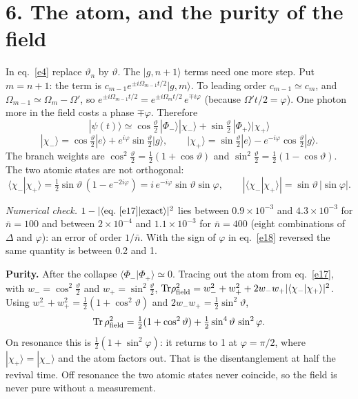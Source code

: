 \documentclass[11pt,letterpaper]{article}
\newcommand{\nbar}{\bar{n}}
\newcommand{\ket}[1]{|#1\rangle}
\newcommand{\braket}[2]{\langle#1|#2\rangle}
\newcommand{\numcheck}[1]{\par{\small\textit{Numerical check.} #1}\par}
\begin{document}
\section*{6. The atom, and the purity of the field}
In eq.~\eqref{e4} replace $\vartheta_n$ by $\vartheta$. The $\ket{g,n+1}$ terms need one more step. Put
$m=n+1$: the term is $c_{m-1}e^{\pm i\Omega_{m-1}t/2}\ket{g,m}$. To leading order $c_{m-1}\simeq c_m$,
and $\Omega_{m-1}\simeq\Omega_m-\Omega'$, so
$e^{\pm i\Omega_{m-1}t/2}=e^{\pm i\Omega_mt/2}\,e^{\mp i\varphi}$ (because $\Omega't/2=\varphi$). One
photon more in the field costs a phase $\mp\varphi$. Therefore
\begin{equation}\label{e17}
\boxed{\;\ket{\psi(t)}\simeq\cos\tfrac\vartheta2\,\ket{\Phi_-}\ket{\chi_-}+\sin\tfrac\vartheta2\,\ket{\Phi_+}\ket{\chi_+}\;}
\end{equation}
\begin{equation}\label{e18}
\ket{\chi_-}=\cos\tfrac\vartheta2\ket{e}+e^{i\varphi}\sin\tfrac\vartheta2\ket{g},\qquad
\ket{\chi_+}=\sin\tfrac\vartheta2\ket{e}-e^{-i\varphi}\cos\tfrac\vartheta2\ket{g}.
\end{equation}
The branch weights are $\cos^2\tfrac\vartheta2=\tfrac12(1+\cos\vartheta)$ and
$\sin^2\tfrac\vartheta2=\tfrac12(1-\cos\vartheta)$. The two atomic states are not orthogonal:
\begin{equation}\label{e19}
\braket{\chi_-}{\chi_+}=\tfrac12\sin\vartheta\,(1-e^{-2i\varphi})=i\,e^{-i\varphi}\sin\vartheta\sin\varphi,
\qquad|\braket{\chi_-}{\chi_+}|=\sin\vartheta\,|\sin\varphi| .
\end{equation}
\numcheck{$1-|\langle\text{eq.~\eqref{e17}}|\text{exact}\rangle|^2$ lies between $0.9\times10^{-3}$ and
$4.3\times10^{-3}$ for $\nbar=100$ and between $2\times10^{-4}$ and $1.1\times10^{-3}$ for $\nbar=400$
(eight combinations of $\Delta$ and $\varphi$): an error of order $1/\nbar$. With the sign of
$\varphi$ in eq.~\eqref{e18} reversed the same quantity is between 0.2 and 1.}

\textbf{Purity.} After the collapse $\braket{\Phi_-}{\Phi_+}\simeq0$. Tracing out the atom from
eq.~\eqref{e17}, with $w_-=\cos^2\tfrac\vartheta2$ and $w_+=\sin^2\tfrac\vartheta2$,
${\rm Tr}\rho_{\rm field}^2=w_-^2+w_+^2+2w_-w_+|\braket{\chi_-}{\chi_+}|^2$. Using
$w_-^2+w_+^2=\tfrac12(1+\cos^2\vartheta)$ and $2w_-w_+=\tfrac12\sin^2\vartheta$,
\begin{equation}\label{e20}
{\rm Tr}\,\rho_{\rm field}^2=\tfrac12(1+\cos^2\vartheta)+\tfrac12\sin^4\vartheta\,\sin^2\varphi .
\end{equation}
On resonance this is $\tfrac12(1+\sin^2\varphi)$: it returns to 1 at $\varphi=\pi/2$, where
$\ket{\chi_+}=\ket{\chi_-}$ and the atom factors out. That is the disentanglement at half the
revival time. Off resonance the two atomic states never coincide, so the field is never pure
without a measurement.
\end{document}
